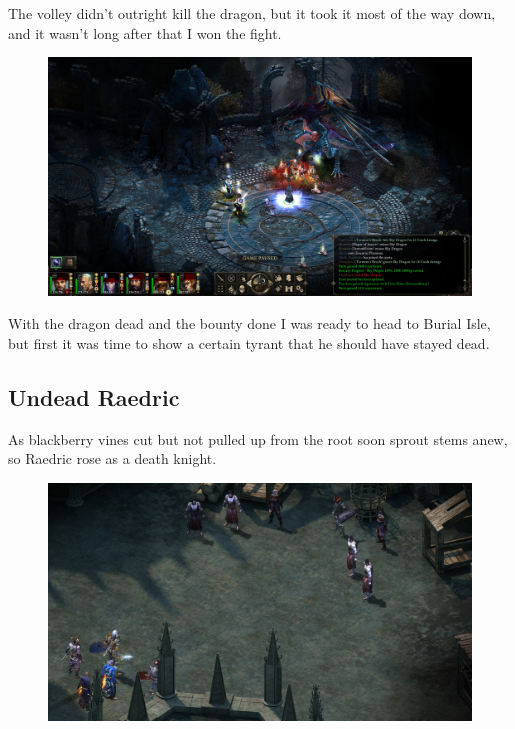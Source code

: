 \documentclass{article}
\begin{document}
The volley didn't outright kill the dragon, but it took it most of the way down, and it wasn't long after that I won the fight.

\begin{figure}
\includegraphics[scale=0.33]{files/blog/2019_03_04_pillars_of_eternity_path_of_the_damned_act_iii/2019_03_04_northweald09.jpg}
\end{figure}

With the dragon dead and the bounty done I was ready to head to Burial Isle, but first it was time to show a certain tyrant that he should have stayed dead.

\subsection{Undead Raedric}

As blackberry vines cut but not pulled up from the root soon sprout stems anew, so Raedric rose as a death knight.

\begin{figure}
\includegraphics[scale=0.33]{files/blog/2019_03_04_pillars_of_eternity_path_of_the_damned_act_iii/2019_03_04_raedric1.jpg}
\end{figure}
\end{document}
